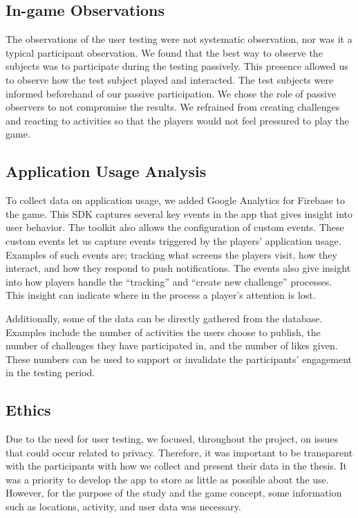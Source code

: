 \subsection{In-game Observations}
The observations of the user testing were not systematic observation, nor was it a typical participant observation. We found that the best way to observe the subjects was to participate during the testing passively. This presence allowed us to observe how the test subject played and interacted. The test subjects were informed beforehand of our passive participation. We chose the role of passive observers to not compromise the results. We refrained from creating challenges and reacting to activities so that the players would not feel pressured to play the game.

\subsection{Application Usage Analysis}
To collect data on application usage, we added Google Analytics for Firebase to the game. This SDK captures several key events in the app that gives insight into user behavior. The toolkit also allows the configuration of custom events. These custom events let us capture events triggered by the players’ application usage. Examples of such events are; tracking what screens the players visit, how they interact, and how they respond to push notifications. The events also give insight into how players handle the “tracking” and “create new challenge” processes. This insight can indicate where in the process a player’s attention is lost.

Additionally, some of the data can be directly gathered from the database. Examples include the number of activities the users choose to publish, the number of challenges they have participated in, and the number of likes given. These numbers can be used to support or invalidate the participants’ engagement in the testing period.

\subsection{Ethics}
Due to the need for user testing, we focused, throughout the project, on issues that could occur related to privacy. Therefore, it was important to be transparent with the participants with how we collect and present their data in the thesis.
It was a priority to develop the app to store as little as possible about the use. However, for the purpose of the study and the game concept, some information such as locations, activity, and user data was necessary.

